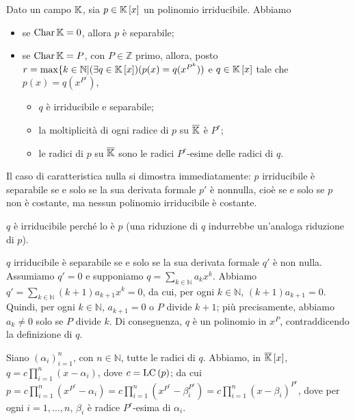 \begin{Theorem}\label{th_separabilita}
	Dato un campo $\mathbb{K}$, sia $p \in \mathbb{K} \left [ x \right ]$ un polinomio irriducibile. Abbiamo
	\begin{itemize}
		\item se $\operatorname{Char}{\mathbb{K}} = 0$, allora $p$ \`e separabile;
		\item se $\operatorname{Char}{\mathbb{K}} = P$, con $P \in \mathbb{Z}$ primo, allora, posto $r = \max \lbrace k \in \mathbb{N} | (\exists q \in \mathbb{K} \left [ x \right ])(p(x) = q(x^{P^k}))$ e $q \in \mathbb{K} \left [ x \right ]$ tale che $p(x) = q(x^{P^r})$,
		\begin{itemize}
			\item $q$ \`e irriducibile e separabile;
			\item la moltiplicit\`a di ogni radice di $p$ su $\overline{\mathbb{K}}$ \`e $P^r$;
			\item le radici di $p$ su $\overline{\mathbb{K}}$ sono le radici $P^r$-esime delle radici di $q$.
		\end{itemize}
	\end{itemize}
\end{Theorem}
\Proof Il caso di caratteristica nulla si dimostra immediatamente: $p$ irriducibile \`e separabile se e solo se la sua derivata formale $p'$ \`e nonnulla, cio\`e se e solo se $p$ non \`e costante, ma nessun polinomio irriducibile \`e costante.
\par $q$ \`e irriducibile perch\'e lo \`e $p$ (una riduzione di $q$ indurrebbe un'analoga riduzione di $p$).
\par $q$ irriducibile \`e separabile se e solo se la sua derivata formale $q'$ \`e non nulla. Assumiamo $q' = 0$ e supponiamo $q = \sum_{k \in \mathbb{N}} a_kx^k$. Abbiamo $q' = \sum_{k \in \mathbb{N}} (k + 1)a_{k + 1}x^k = 0$, da cui, per ogni $k \in \mathbb{N}$, $(k + 1)a_{k + 1} = 0$. Quindi, per ogni $k \in \mathbb{N}$, $a_{k + 1} = 0$ o $P$ divide $k + 1$; pi\`u precisamente, abbiamo $a_k \neq 0$ solo se $P$ divide $k$. Di conseguenza, $q$ \`e un polinomio in $x^P$, contraddicendo la definizione di $q$.
\par Siano $(\alpha_i)_{i = 1}^n$, con $n \in \mathbb{N}$, tutte le radici di $q$. Abbiamo, in $\overline{\mathbb{K}} \left [ x \right ]$, $q = c \prod_{i = 1}^n (x - \alpha_i)$, dove $c = \text{LC} \left ( p \right )$; da cui $p = c \prod_{i = 1}^n \left (x^{P^r} - \alpha_i \right ) = c \prod_{i = 1}^n \left (x^{P^r} - \beta_i^{P^r} \right ) = c \prod_{i = 1}^n (x - \beta_i)^{P^r}$, dove per ogni $i = 1, ..., n$, $\beta_i$ \`e radice $P^r$-esima di $\alpha_i$. \EndProof
